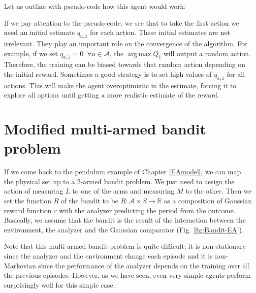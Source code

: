 \documentclass[11pt,a4paper,twoside]{report}
\DeclareMathOperator*{\argmax}{arg\,max}
\newcommand{\+}{\textnormal{+} }
\theoremstyle{definition}
\numberwithin{equation}{chapter}
\begin{document}
Let us outline with pseudo-code how this agent would work:

\makeatletter
\def\BState{\State\hskip-\ALG@thistlm}
\makeatother
\begin{algorithm}
  \caption{}\label{Non-stationary mulit-armed bandit}
  \end{algorithm}

  If we pay attention to the pseudo-code, we see that to take the first action
  we need an initial estimate $q_{a,1}$ for each action. These initial estimates
  are not irrelevant. They play an important role on the convergence of the
  algorithm. For example, if we set $q_{a,1}=0 \; \; \forall a \in \mathcal{A}$, the
  $\argmax Q_1$ will output a random action. Therefore, the training can be
  biased towards that random action depending on the initial reward. Sometimes a
  good strategy is to set high values of $q_{a,1}$ for all actions. This will make
  the agent overoptimistic in the estimate, forcing it to explore all options
  until getting a more realistic estimate of the reward.

\section{Modified multi-armed bandit problem}

If we come back to the pendulum example of Chapter \ref{EAmodel}, we can map the
physical set up to a 2-armed bandit problem. We just need to assign the action
of  measuring $L$ to one of the arms and measuring $M$ to the other. Then we set
the function $R$ of the bandit to be $R:\mathcal{A}\times S\rightarrow
\mathbb{R}$ as a composition of Gaussian reward function $r$ with the analyzer
predicting the period from the outcome. Basically, we assume that the bandit is
the result of the interaction between the environment, the analyzer and the
Gaussian comparator (Fig. \ref{fig:Bandit-EA}). \par Note that this multi-armed
bandit problem is quite difficult: it is non-stationary since the analyzer and
the environment change each episode and it is non-Markovian since the
performance of the analyzer depends on the training over all the previous
episodes. However, as we have seen, even very simple agents perform surprisingly
well for this simple case.
\end{document}
